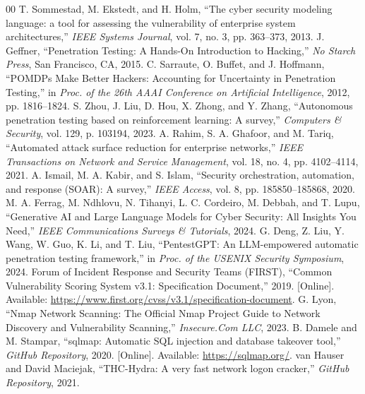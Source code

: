 \documentclass[conference]{IEEEtran}
\begin{document}
\begin{thebibliography}{00}
 T. Sommestad, M. Ekstedt, and H. Holm, ``The cyber security modeling language: a tool for assessing the vulnerability of enterprise system architectures,'' \emph{IEEE Systems Journal}, vol. 7, no. 3, pp. 363--373, 2013.
 J. Geffner, ``Penetration Testing: A Hands-On Introduction to Hacking,'' \emph{No Starch Press}, San Francisco, CA, 2015.
 C. Sarraute, O. Buffet, and J. Hoffmann, ``POMDPs Make Better Hackers: Accounting for Uncertainty in Penetration Testing,'' in \emph{Proc. of the 26th AAAI Conference on Artificial Intelligence}, 2012, pp. 1816--1824.
 S. Zhou, J. Liu, D. Hou, X. Zhong, and Y. Zhang, ``Autonomous penetration testing based on reinforcement learning: A survey,'' \emph{Computers \& Security}, vol. 129, p. 103194, 2023.
 A. Rahim, S. A. Ghafoor, and M. Tariq, ``Automated attack surface reduction for enterprise networks,'' \emph{IEEE Transactions on Network and Service Management}, vol. 18, no. 4, pp. 4102--4114, 2021.
 A. Ismail, M. A. Kabir, and S. Islam, ``Security orchestration, automation, and response (SOAR): A survey,'' \emph{IEEE Access}, vol. 8, pp. 185850--185868, 2020.
 M. A. Ferrag, M. Ndhlovu, N. Tihanyi, L. C. Cordeiro, M. Debbah, and T. Lupu, ``Generative AI and Large Language Models for Cyber Security: All Insights You Need,'' \emph{IEEE Communications Surveys \& Tutorials}, 2024.
 G. Deng, Z. Liu, Y. Wang, W. Guo, K. Li, and T. Liu, ``PentestGPT: An LLM-empowered automatic penetration testing framework,'' in \emph{Proc. of the USENIX Security Symposium}, 2024.
 Forum of Incident Response and Security Teams (FIRST), ``Common Vulnerability Scoring System v3.1: Specification Document,'' 2019. [Online]. Available: \url{https://www.first.org/cvss/v3.1/specification-document}.
 G. Lyon, ``Nmap Network Scanning: The Official Nmap Project Guide to Network Discovery and Vulnerability Scanning,'' \emph{Insecure.Com LLC}, 2023.
 B. Damele and M. Stampar, ``sqlmap: Automatic SQL injection and database takeover tool,'' \emph{GitHub Repository}, 2020. [Online]. Available: \url{https://sqlmap.org/}.
 van Hauser and David Maciejak, ``THC-Hydra: A very fast network logon cracker,'' \emph{GitHub Repository}, 2021.
\end{thebibliography}
\end{document}
